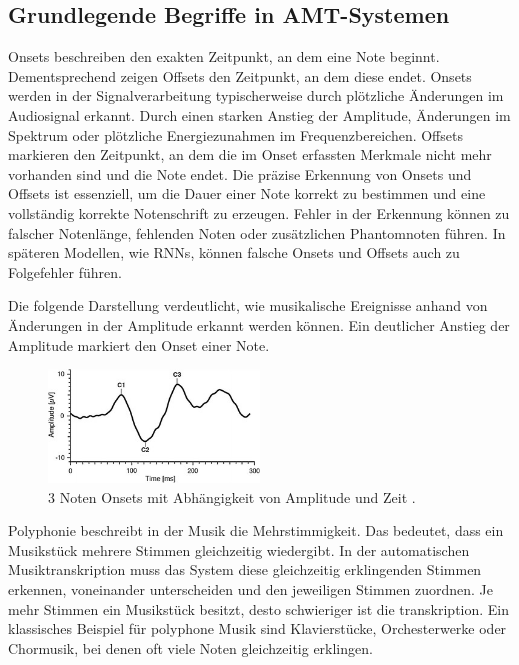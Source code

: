 \subsection{Grundlegende Begriffe in AMT-Systemen}
\begin{description}[style=nextline]
\item[Onsets und Offsets]\label{itm:onset_offset}
Onsets beschreiben den exakten Zeitpunkt, an dem eine Note beginnt.
Dementsprechend zeigen Offsets den Zeitpunkt, an dem diese endet.
Onsets werden in der Signalverarbeitung typischerweise durch plötzliche Änderungen im Audiosignal erkannt.
Durch einen starken Anstieg der Amplitude, Änderungen im Spektrum oder plötzliche Energiezunahmen im Frequenzbereichen.
Offsets markieren den Zeitpunkt, an dem die im Onset erfassten Merkmale nicht mehr vorhanden sind und die Note endet.
Die präzise Erkennung von Onsets und Offsets ist essenziell,
um die Dauer einer Note korrekt zu bestimmen und eine vollständig korrekte Notenschrift zu erzeugen.
Fehler in der Erkennung können zu falscher Notenlänge, fehlenden Noten oder zusätzlichen Phantomnoten führen.
In späteren Modellen, wie RNNs, können falsche Onsets und Offsets auch zu Folgefehler führen.

Die folgende Darstellung verdeutlicht,
wie musikalische Ereignisse anhand von Änderungen in der Amplitude erkannt werden können.
Ein deutlicher Anstieg der Amplitude markiert den Onset einer Note.
\begin{figure}[H]
    \centering
    \includegraphics[width=0.5\textwidth]{Graphics/Onset_detection}
    \caption[Noten Onsets]{3 Noten Onsets mit Abhängigkeit von Amplitude und Zeit \cite{brown2016patternvep}.}
    \label{fig:onsets}
\end{figure}
\end{description}

\begin{description}[style=nextline]
\item[Polyphonie]\label{itm:polyphonie}
Polyphonie beschreibt in der Musik die Mehrstimmigkeit.
Das bedeutet, dass ein Musikstück mehrere Stimmen gleichzeitig wiedergibt.
In der automatischen Musiktranskription muss das System diese gleichzeitig erklingenden Stimmen erkennen, voneinander unterscheiden und den jeweiligen Stimmen zuordnen.
Je mehr Stimmen ein Musikstück besitzt, desto schwieriger ist die transkription.
Ein klassisches Beispiel für polyphone Musik sind Klavierstücke, Orchesterwerke oder Chormusik, bei denen oft viele Noten gleichzeitig erklingen.
\end{description}

